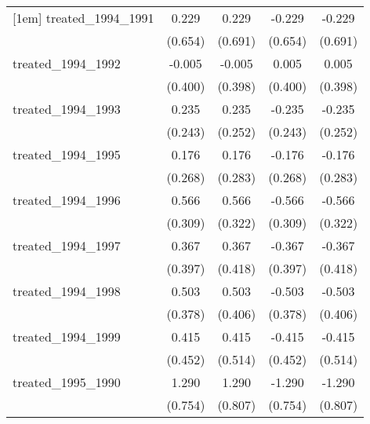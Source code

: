 {\begin{tabular}{l*{4}{c}}
[1em]
treated\_1994\_1991&       0.229         &       0.229         &      -0.229         &      -0.229         \\
            &     (0.654)         &     (0.691)         &     (0.654)         &     (0.691)         \\
[1em]
treated\_1994\_1992&      -0.005         &      -0.005         &       0.005         &       0.005         \\
            &     (0.400)         &     (0.398)         &     (0.400)         &     (0.398)         \\
[1em]
treated\_1994\_1993&       0.235         &       0.235         &      -0.235         &      -0.235         \\
            &     (0.243)         &     (0.252)         &     (0.243)         &     (0.252)         \\
[1em]
treated\_1994\_1995&       0.176         &       0.176         &      -0.176         &      -0.176         \\
            &     (0.268)         &     (0.283)         &     (0.268)         &     (0.283)         \\
[1em]
treated\_1994\_1996&       0.566         &       0.566         &      -0.566         &      -0.566         \\
            &     (0.309)         &     (0.322)         &     (0.309)         &     (0.322)         \\
[1em]
treated\_1994\_1997&       0.367         &       0.367         &      -0.367         &      -0.367         \\
            &     (0.397)         &     (0.418)         &     (0.397)         &     (0.418)         \\
[1em]
treated\_1994\_1998&       0.503         &       0.503         &      -0.503         &      -0.503         \\
            &     (0.378)         &     (0.406)         &     (0.378)         &     (0.406)         \\
[1em]
treated\_1994\_1999&       0.415         &       0.415         &      -0.415         &      -0.415         \\
            &     (0.452)         &     (0.514)         &     (0.452)         &     (0.514)         \\
[1em]
treated\_1995\_1990&       1.290         &       1.290         &      -1.290         &      -1.290         \\
            &     (0.754)         &     (0.807)         &     (0.754)         &     (0.807)         \\

\end{tabular}}
